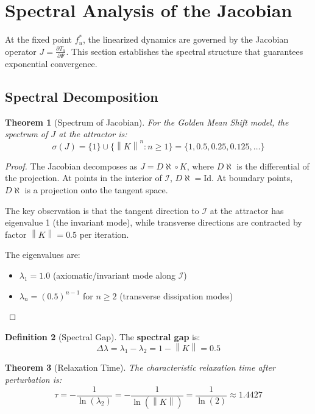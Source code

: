 \documentclass[11pt,a4paper]{article}
\theoremstyle{plain}
\newtheorem{theorem}{Theorem}[section]
\theoremstyle{definition}
\newtheorem{definition}[theorem]{Definition}
\newcommand{\I}{\mathcal{I}}
\newcommand{\norm}[1]{\left\lVert #1 \right\rVert}
\begin{document}
\section{Spectral Analysis of the Jacobian}

At the fixed point $f^*_u$, the linearized dynamics are governed by the Jacobian operator $J = \frac{\partial T_u}{\partial \Psi}$. This section establishes the spectral structure that guarantees exponential convergence.

\subsection{Spectral Decomposition}

\begin{theorem}[Spectrum of Jacobian]\label{thm:spectrum}
For the Golden Mean Shift model, the spectrum of $J$ at the attractor is:
\[
\sigma(J) = \{1\} \cup \{\norm{K}^n : n \geq 1\} = \{1, 0.5, 0.25, 0.125, \ldots\}
\]
\end{theorem}

\begin{proof}
The Jacobian decomposes as $J = D\aleph \circ K$, where $D\aleph$ is the differential of the projection. At points in the interior of $\I$, $D\aleph = \text{Id}$. At boundary points, $D\aleph$ is a projection onto the tangent space.

The key observation is that the tangent direction to $\I$ at the attractor has eigenvalue 1 (the invariant mode), while transverse directions are contracted by factor $\norm{K} = 0.5$ per iteration.

The eigenvalues are:
\begin{itemize}
    \item $\lambda_1 = 1.0$ (axiomatic/invariant mode along $\I$)
    \item $\lambda_n = (0.5)^{n-1}$ for $n \geq 2$ (transverse dissipation modes)
\end{itemize}
\end{proof}

\begin{definition}[Spectral Gap]
The \textbf{spectral gap} is:
\[
\Delta\lambda = \lambda_1 - \lambda_2 = 1 - \norm{K} = 0.5
\]
\end{definition}

\begin{theorem}[Relaxation Time]\label{thm:relaxation}
The characteristic relaxation time after perturbation is:
\[
\tau = -\frac{1}{\ln(\lambda_2)} = -\frac{1}{\ln(\norm{K})} = \frac{1}{\ln(2)} \approx 1.4427
\]
\end{theorem}
\end{document}
